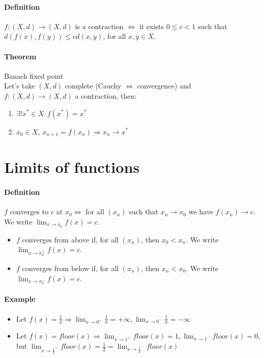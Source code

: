 \documentclass{article}
\newcommand{\DS}{\displaystyle}
\newcommand{\func}[3]{#1 : #2 \rightarrow #3}
\newcommand{\limx}[1]{\lim_{x \to #1}}
\newcommand{\Def}{\paragraph{Definition}}
\newcommand{\Theorem}{\paragraph{Theorem}}
\newcommand{\Example}{\paragraph{Example}}
\begin{document}
  \Def $\func{f}{(X,d)}{(X,d)}$ is a contraction $\iff$ it exists $0 \leq c < 1$
  such that $d(f(x),f(y)) \leq cd(x,y)$, for all $x,y \in X$.

  \Theorem Banach fixed point
\\Let's take $(X,d)$ complete (Cauchy $\iff$ convergence) and
  $\func{f}{(X,d)}{(X,d)}$ a contraction, then:
  \begin{enumerate}[label=(\roman*)]
    \item $\exists! x^* \in X : f(x^*) = x^*$
    \item $x_0 \in X$, $x_{n+1} = f(x_n) \Rightarrow x_n \to x^*$
  \end{enumerate}

\section{Limits of functions}

  \Def $f$ converges to $c$ at $x_0 \iff$ for all $(x_n)$ such that $x_n \to x_0$
  we have $f(x_n) \to c$. We write $\DS \limx{x_0} f(x) = c$.
  \begin{itemize}
    \item $f$ converges from above if, for all $(x_n)$, then $x_0 < x_n$.
    We write $\DS \limx{x_0^+} f(x) = c$.
    \item $f$ converges from below if, for all $(x_n)$, then $x_n < x_0$.
    We write $\DS \limx{x_0^-} f(x) = c$.
  \end{itemize}

  \Example
  \begin{itemize}
    \item Let $\DS f(x) = \frac{1}{x} \Rightarrow \limx{0^+} \frac{1}{x} =
    +\infty, \limx{0^-} \frac{1}{x} = -\infty$
    \item Let $\DS f(x) = floor(x) \Rightarrow \limx{1^+} floor(x) = 1,
    \limx{1^-} floor(x) = 0$, but $\DS \limx{\frac{1}{2}^+} floor(x) =
    \frac{1}{2} = \limx{\frac{1}{2}^-} floor(x)$
  \end{itemize}
\end{document}
